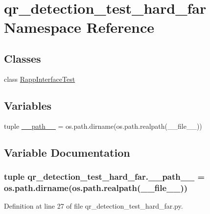 \hypertarget{namespaceqr__detection__test__hard__far}{\section{qr\-\_\-detection\-\_\-test\-\_\-hard\-\_\-far Namespace Reference}
\label{namespaceqr__detection__test__hard__far}
}
\subsection*{Classes}
\begin{DoxyCompactItemize}
\item 
class \hyperlink{classqr__detection__test__hard__far_1_1RappInterfaceTest}{Rapp\-Interface\-Test}
\end{DoxyCompactItemize}
\subsection*{Variables}
\begin{DoxyCompactItemize}
\item 
tuple \hyperlink{namespaceqr__detection__test__hard__far_a30169784335c0c2c7c724e5c58c550f2}{\-\_\-\-\_\-path\-\_\-\-\_\-} = os.\-path.\-dirname(os.\-path.\-realpath(\-\_\-\-\_\-file\-\_\-\-\_\-))
\end{DoxyCompactItemize}


\subsection{Variable Documentation}
\hypertarget{namespaceqr__detection__test__hard__far_a30169784335c0c2c7c724e5c58c550f2}{
\subsubsection[{\-\_\-\-\_\-path\-\_\-\-\_\-}]{\setlength{\rightskip}{0pt plus 5cm}tuple qr\-\_\-detection\-\_\-test\-\_\-hard\-\_\-far.\-\_\-\-\_\-path\-\_\-\-\_\- = os.\-path.\-dirname(os.\-path.\-realpath(\-\_\-\-\_\-file\-\_\-\-\_\-))}}\label{namespaceqr__detection__test__hard__far_a30169784335c0c2c7c724e5c58c550f2}


Definition at line 27 of file qr\-\_\-detection\-\_\-test\-\_\-hard\-\_\-far.\-py.

